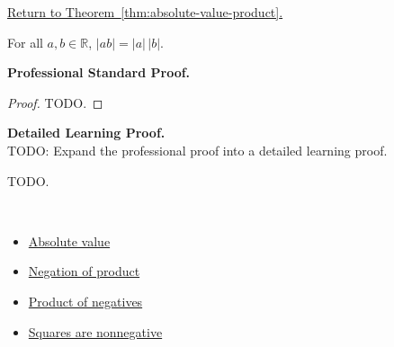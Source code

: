 \newpage
{}
\label{prf:absolute-value-product}

\begin{remark*}[Return]
\hyperref[thm:absolute-value-product]{Return to Theorem~\ref*{thm:absolute-value-product}.}
\end{remark*}

\begin{theorem*}
For all $a, b \in \mathbb{R}$,
$\lvert ab \rvert = \lvert a \rvert\,\lvert b \rvert$.
\end{theorem*}

\textbf{Professional Standard Proof.}~\\
\begin{proof}
TODO.
\end{proof}

\textbf{Detailed Learning Proof.}~\\
TODO: Expand the professional proof into a detailed learning proof.


\begin{remark*}
TODO.
\end{remark*}

\begin{remark*}[Dependencies]~\\
\begin{itemize}
  \item \hyperref[def:absolute-value]{Absolute value}
  \item \hyperref[thm:negation-of-product]{Negation of product}
  \item \hyperref[cor:product-of-negatives]{Product of negatives}
  \item \hyperref[thm:squares-nonnegative]{Squares are nonnegative}
\end{itemize}
\end{remark*}
